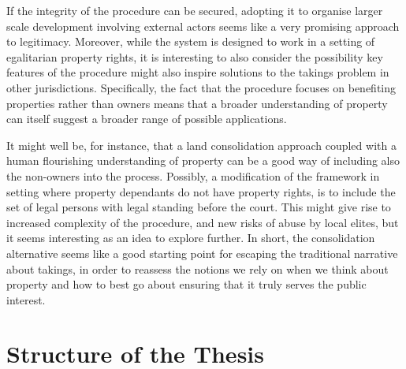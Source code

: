 If the integrity of the procedure can be secured, adopting it to organise larger scale development involving external actors seems like a very promising approach to legitimacy. Moreover, while the system is designed to work in a setting of egalitarian property rights, it is interesting to also consider the possibility key features of the procedure might also inspire solutions to the takings problem in other jurisdictions. Specifically, the fact that the procedure focuses on benefiting properties rather than owners means that a broader understanding of property can itself suggest a broader range of possible applications. 

It might well be, for instance, that a land consolidation approach coupled with a human flourishing understanding of property can be a good way of including also the non-owners into the process. Possibly, a modification of the framework in setting where property dependants do not have property rights, is to include the set of legal persons with legal standing before the court. This might give rise to increased complexity of the procedure, and new risks of abuse by local elites, but it seems interesting as an idea to explore further. In short, the consolidation alternative seems like a good starting point for escaping the traditional narrative about takings, in order to reassess the notions we rely on when we think about property and how to best go about ensuring that it truly serves the public interest.


\section{Structure of the Thesis}

